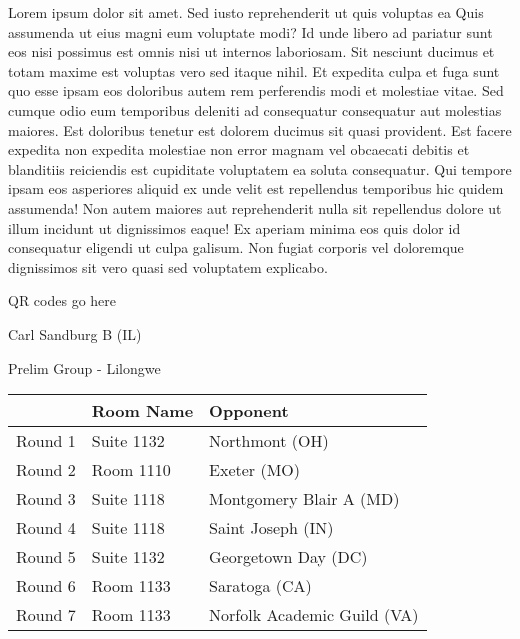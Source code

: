 \documentclass{article}%
\begin{document}
\vspace*{8pt}%
\linebreak%
\newline%
\newline%
Lorem ipsum dolor sit amet. Sed iusto reprehenderit ut quis voluptas ea Quis assumenda ut eius magni eum voluptate modi? Id unde libero ad pariatur sunt eos nisi possimus est omnis nisi ut internos laboriosam. Sit nesciunt ducimus et totam maxime est voluptas vero sed itaque nihil. Et expedita culpa et fuga sunt quo esse ipsam eos doloribus autem rem perferendis modi et molestiae vitae.\newline%
\newline%
Sed cumque odio eum temporibus deleniti ad consequatur consequatur aut molestias maiores. Est doloribus tenetur est dolorem ducimus sit quasi provident. Est facere expedita non expedita molestiae non error magnam vel obcaecati debitis et blanditiis reiciendis est cupiditate voluptatem ea soluta consequatur. Qui tempore ipsam eos asperiores aliquid ex unde velit est repellendus temporibus hic quidem assumenda!\newline%
\newline%
Non autem maiores aut reprehenderit nulla sit repellendus dolore ut illum incidunt ut dignissimos eaque! Ex aperiam minima eos quis dolor id consequatur eligendi ut culpa galisum. Non fugiat corporis vel doloremque dignissimos sit vero quasi sed voluptatem explicabo.\newline%
\newline%
%
\vspace*{30pt}%
\begin{center}%
\begin{Huge}%
QR codes go here%
\end{Huge}%
\end{center}%
\newpage%
%
\begin{center}%
\begin{Huge}%
Carl Sandburg B (IL)%
\end{Huge}%
\vspace*{8pt}%
\linebreak%
\begin{Large}%
Prelim Group {-} Lilongwe%
\end{Large}%
\end{center}%
\begin{tabularx}{\textwidth}{|c|Y|Y|}%
\hline%
&Room Name&Opponent\\%
\hline%
Round 1&Suite 1132&Northmont (OH)\\%
Round 2&Room 1110&Exeter (MO)\\%
Round 3&Suite 1118&Montgomery Blair A (MD)\\%
Round 4&Suite 1118&Saint Joseph (IN)\\%
Round 5&Suite 1132&Georgetown Day (DC)\\%
Round 6&Room 1133&Saratoga (CA)\\%
Round 7&Room 1133&Norfolk Academic Guild (VA)\\%
\hline%
\end{tabularx}%
\end{document}
